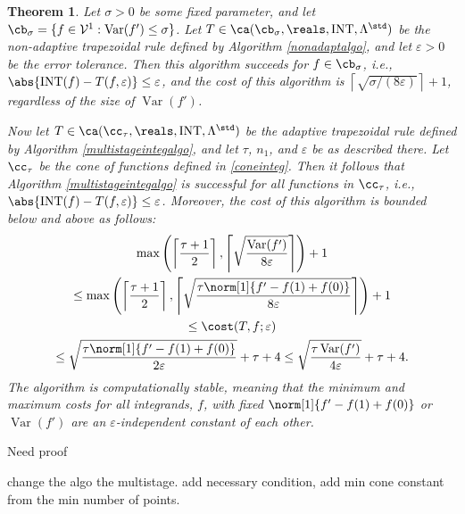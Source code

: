 \documentclass{iitthesis}
\DeclareMathOperator{\Var}{Var}
\DeclareMathOperator{\INT}{INT}
\newtheorem{theorem}{Theorem}
\theoremstyle{definition}
\theoremstyle{remark}
\begin{document}
\begin{theorem} \label{multistageintegthm}
Let $\sigma >0$ be some fixed parameter, and let $\cb_{\sigma}=\{f \in  \mathcal{V}^{1} : \Var(f')\leq \sigma\}$. Let $T \in \ca(\cb_{\sigma}, \reals, \INT, \Lambda^{\std})$ be the non-adaptive trapezoidal rule defined by Algorithm \ref{nonadaptalgo}, and let $\varepsilon>0$ be the error tolerance. Then this algorithm succeeds for $f \in \cb_{\sigma}$, i.e., $\abs{\INT(f) - T(f,\varepsilon)} \le \varepsilon$, and the cost of this algorithm is $\left \lceil \sqrt{\sigma/(8\varepsilon)}\right \rceil + 1$, regardless of the size of $\Var(f')$.

Now let $T \in \ca(\cc_{\tau}, \reals, \INT, \Lambda^{\std})$ be the adaptive trapezoidal rule defined by Algorithm \ref{multistageintegalgo}, and let $\tau$, $n_1$, and $\varepsilon$ be as described there. Let $\cc_\tau$ be the cone of functions defined in \eqref{coneinteg}.  Then it follows that Algorithm \ref{multistageintegalgo} is successful for all functions in $\cc_{\tau}$,  i.e.,  $\abs{\INT(f) - T(f,\varepsilon)} \le \varepsilon$.  Moreover, the cost of this algorithm is bounded below and above as follows:
\begin{multline}
\max \left(\left \lceil\frac{\tau+1}{2} \right \rceil, \left \lceil \sqrt{\frac{ \Var(f')}{8\varepsilon}} \right \rceil \right) +1 \\
\le \max \left(\left \lceil\frac{\tau+1}{2} \right \rceil, \left \lceil \sqrt{\frac{\tau \norm[1]{f'-f(1)+f(0)}}{8\varepsilon}} \right \rceil \right) +1 \\
\le
\cost(T,f;\varepsilon) \\
\le \sqrt{\frac{\tau \norm[1]{f'-f(1)+f(0)}}{2\varepsilon}} + \tau + 4
\le \sqrt{\frac{\tau \Var(f') }{4\varepsilon}} + \tau + 4.
\end{multline}
The algorithm is computationally stable, meaning that the minimum and maximum costs for all integrands, $f$, with fixed $\norm[1]{f'-f(1)+f(0)}$ or $\Var(f')$ are an $\varepsilon$-independent constant of each other.
\end{theorem}

 Need proof

change the algo the multistage. add necessary condition, add min cone constant from the min number of points.
\end{document}
